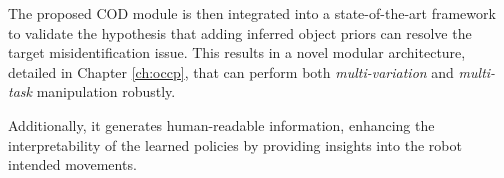 The proposed COD module is then integrated into a state-of-the-art framework to validate the hypothesis that adding inferred object priors can resolve the target misidentification issue. This results in a novel modular architecture, detailed in Chapter \ref{ch:occp}, that can perform both \textit{multi-variation} and \textit{multi-task} manipulation robustly. 

Additionally, it generates human-readable information, enhancing the interpretability of the learned policies by providing insights into the robot intended movements.

